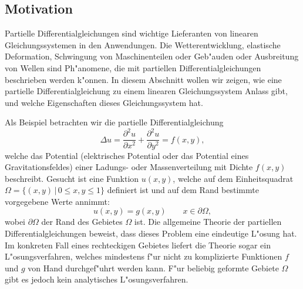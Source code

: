 \subsection{Motivation\label{section-motivation}}
Partielle Differentialgleichungen sind wichtige Lieferanten von 
linearen Gleichungssystemen in den Anwendungen.
Die Wetterentwicklung, elastische Deformation, Schwingung von
Maschinenteilen oder Geb"auden oder Ausbreitung von Wellen sind
Ph"anomene, die mit partiellen Differentialgleichungen beschrieben
werden k"onnen. In diesem Abschnitt wollen wir zeigen, wie eine
partielle Differentialgleichung zu einem linearen Gleichungssystem
Anlass gibt, und welche Eigenschaften dieses Gleichungssystem hat.

Als Beispiel betrachten wir die partielle Differentialgleichung
\begin{equation}
\Delta u
=\frac{\partial^2u}{\partial x^2}+\frac{\partial^2u}{\partial y^2}
=f(x,y),
\label{motivation-pdgl}
\end{equation}
welche das Potential (elektrisches Potential oder das Potential eines
Gravitationsfeldes) einer Ladungs- oder Massenverteilung mit
Dichte $f(x,y)$ beschreibt.
Gesucht ist eine Funktion $u(x,y)$, welche auf dem Einheitsquadrat
$\Omega = \{(x,y)\,|\, 0\le x,y\le 1\}$ definiert ist und auf dem Rand bestimmte
vorgegebene Werte annimmt:
\begin{equation}
u(x,y)=g(x,y)\qquad x\in\partial \Omega,
\label{motivation-randbedingung}
\end{equation}
wobei $\partial\Omega$ der Rand des Gebietes $\Omega$ ist. Die allgemeine
Theorie der partiellen Differentialgleichungen beweist, dass dieses
Problem eine eindeutige L"osung hat.
Im konkreten Fall eines rechteckigen Gebietes liefert die Theorie sogar
ein L"osungsverfahren, welches mindestens f"ur nicht zu komplizierte
Funktionen $f$ und $g$ von Hand durchgef"uhrt werden kann.
F"ur beliebig geformte Gebiete $\Omega$ gibt es jedoch kein analytisches
L"osungsverfahren.


